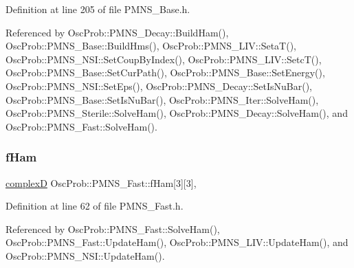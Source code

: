 Definition at line 205 of file P\+M\+N\+S\+\_\+\+Base.\+h.



Referenced by Osc\+Prob\+::\+P\+M\+N\+S\+\_\+\+Decay\+::\+Build\+Ham(), Osc\+Prob\+::\+P\+M\+N\+S\+\_\+\+Base\+::\+Build\+Hms(), Osc\+Prob\+::\+P\+M\+N\+S\+\_\+\+L\+I\+V\+::\+Seta\+T(), Osc\+Prob\+::\+P\+M\+N\+S\+\_\+\+N\+S\+I\+::\+Set\+Coup\+By\+Index(), Osc\+Prob\+::\+P\+M\+N\+S\+\_\+\+L\+I\+V\+::\+Setc\+T(), Osc\+Prob\+::\+P\+M\+N\+S\+\_\+\+Base\+::\+Set\+Cur\+Path(), Osc\+Prob\+::\+P\+M\+N\+S\+\_\+\+Base\+::\+Set\+Energy(), Osc\+Prob\+::\+P\+M\+N\+S\+\_\+\+N\+S\+I\+::\+Set\+Eps(), Osc\+Prob\+::\+P\+M\+N\+S\+\_\+\+Decay\+::\+Set\+Is\+Nu\+Bar(), Osc\+Prob\+::\+P\+M\+N\+S\+\_\+\+Base\+::\+Set\+Is\+Nu\+Bar(), Osc\+Prob\+::\+P\+M\+N\+S\+\_\+\+Iter\+::\+Solve\+Ham(), Osc\+Prob\+::\+P\+M\+N\+S\+\_\+\+Sterile\+::\+Solve\+Ham(), Osc\+Prob\+::\+P\+M\+N\+S\+\_\+\+Decay\+::\+Solve\+Ham(), and Osc\+Prob\+::\+P\+M\+N\+S\+\_\+\+Fast\+::\+Solve\+Ham().

\mbox{\label{classOscProb_1_1PMNS__Fast_a94286a881bc53dd512a89d548346b611}} 
\subsubsection{\texorpdfstring{f\+Ham}{fHam}}
{\footnotesize\ttfamily \hyperlink{EigenPoint_8h_a67ca8e107e20610c3fff78d5e726ece0}{complexD} Osc\+Prob\+::\+P\+M\+N\+S\+\_\+\+Fast\+::f\+Ham\mbox{[}3\mbox{]}\mbox{[}3\mbox{]}\hspace{0.3cm}{\ttfamily [protected]}, {\ttfamily [inherited]}}



Definition at line 62 of file P\+M\+N\+S\+\_\+\+Fast.\+h.



Referenced by Osc\+Prob\+::\+P\+M\+N\+S\+\_\+\+Fast\+::\+Solve\+Ham(), Osc\+Prob\+::\+P\+M\+N\+S\+\_\+\+Fast\+::\+Update\+Ham(), Osc\+Prob\+::\+P\+M\+N\+S\+\_\+\+L\+I\+V\+::\+Update\+Ham(), and Osc\+Prob\+::\+P\+M\+N\+S\+\_\+\+N\+S\+I\+::\+Update\+Ham().

\mbox{\label{classOscProb_1_1PMNS__Base_acd3c8783e7603081eab316ea4c86c766}} 
